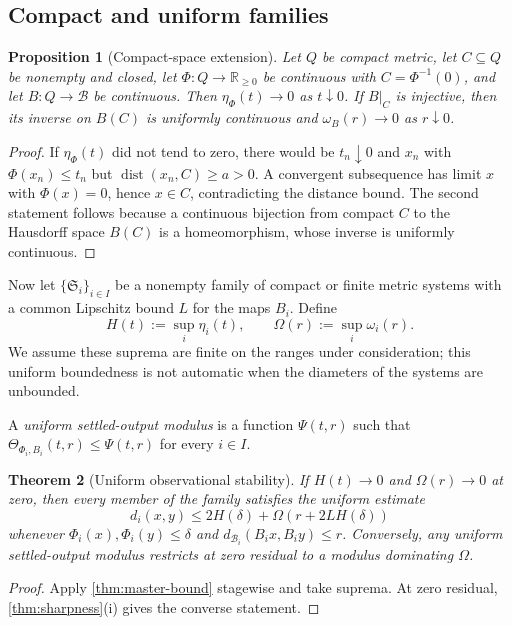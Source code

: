 \documentclass[11pt]{article}
\newtheorem{theorem}{Theorem}[section]
\newtheorem{proposition}[theorem]{Proposition}
\theoremstyle{definition}
\theoremstyle{remark}
\numberwithin{equation}{section}
\newcommand{\dist}{\operatorname{dist}}
\newcommand{\cB}{\mathcal B}
\begin{document}
\subsection{Compact and uniform families}

\begin{proposition}[Compact-space extension]\label{prop:compact-extension}
Let $Q$ be compact metric, let $C\subseteq Q$ be nonempty and closed, let $\Phi:Q\to\mathbb R_{\ge0}$ be continuous with $C=\Phi^{-1}(0)$, and let $B:Q\to\cB$ be continuous.  Then $\eta_\Phi(t)\to0$ as $t\downarrow0$.  If $B|_C$ is injective, then its inverse on $B(C)$ is uniformly continuous and $\omega_B(r)\to0$ as $r\downarrow0$.
\end{proposition}

\begin{proof}
If $\eta_\Phi(t)$ did not tend to zero, there would be $t_n\downarrow0$ and $x_n$ with $\Phi(x_n)\le t_n$ but $\dist(x_n,C)\ge a>0$.  A convergent subsequence has limit $x$ with $\Phi(x)=0$, hence $x\in C$, contradicting the distance bound.  The second statement follows because a continuous bijection from compact $C$ to the Hausdorff space $B(C)$ is a homeomorphism, whose inverse is uniformly continuous.
\end{proof}

Now let $\{\mathfrak S_i\}_{i\in I}$ be a nonempty family of compact or finite metric systems with a common Lipschitz bound $L$ for the maps $B_i$.  Define
\[
 H(t):=\sup_i\eta_i(t),\qquad
 \Omega(r):=\sup_i\omega_i(r).
\]
We assume these suprema are finite on the ranges under consideration; this
uniform boundedness is not automatic when the diameters of the systems are
unbounded.

A \emph{uniform settled-output modulus} is a function
$\Psi(t,r)$ such that
$\Theta_{\Phi_i,B_i}(t,r)\le\Psi(t,r)$ for every $i\in I$.

\begin{theorem}[Uniform observational stability]\label{thm:uniform-family}
If $H(t)\to0$ and $\Omega(r)\to0$ at zero, then every member of the family satisfies the uniform estimate
\[
 d_i(x,y)\le
 2H(\delta)+\Omega(r+2LH(\delta))
\]
whenever $\Phi_i(x),\Phi_i(y)\le\delta$ and
$d_{\cB_i}(B_ix,B_iy)\le r$.  Conversely, any uniform settled-output modulus restricts at zero residual to a modulus dominating $\Omega$.
\end{theorem}

\begin{proof}
Apply \cref{thm:master-bound} stagewise and take suprema.  At zero residual, \cref{thm:sharpness}(i) gives the converse statement.
\end{proof}
\end{document}
